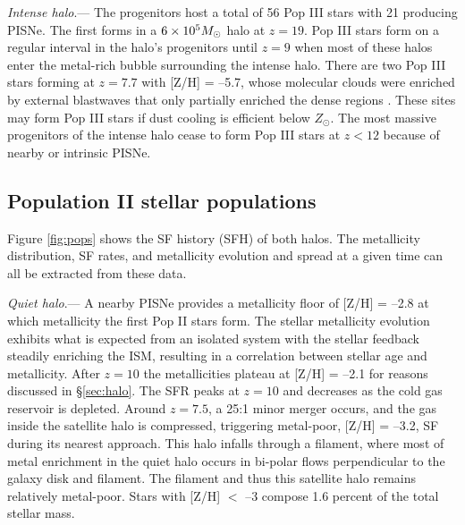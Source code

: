 \documentclass[apjl]{emulateapj}
\begin{document}
\textit{Intense halo}.--- The progenitors host a total of 56 Pop III
stars with 21 producing PISNe.  The first forms in a $6 \times 10^5
\Ms$ halo at $z=19$.  Pop III stars form on a regular interval in the
halo's progenitors until $z=9$ when most of these halos enter the
metal-rich bubble surrounding the intense halo.  There are two Pop III
stars forming at $z=7.7$ with [Z/H] = --5.7, whose molecular clouds
were enriched by external blastwaves that only partially enriched the
dense regions \citep{Cen08}.  These sites may form Pop III stars if
dust cooling is efficient below  $Z_\odot$.  The most
massive progenitors of the intense halo cease to form Pop III stars at
$z<12$ because of nearby or intrinsic PISNe.

\subsection{Population II stellar populations}
\label{sec:pop}

\begin{figure*}
  \caption{\label{fig:pops} The scatter plots show the SF history of
    the quiet (left) and intense (right) halos as a function of
    metallicity at $z=7$.  Each circle represents a star cluster,
    whose area is proportional to its mass.  The open circles in the
    upper right represent sizes of $10^3$, $10^4$, and $10^5$ \Ms~star
    clusters.  The dashed lines in the right panel guide the eye to
    two stellar populations that were formed in two satellite halos,
    merging at $z=7.5$.  The upper histogram collects the SF history
    into 25 equal temporal bins.  The right histogram depicts the
    stellar metallicity distribution.}
\end{figure*}


Figure \ref{fig:pops} shows the SF history (SFH) of both halos.  The
metallicity distribution, SF rates, and metallicity evolution and
spread at a given time can all be extracted from these data.

\textit{Quiet halo}.--- A nearby PISNe provides a metallicity floor of
[Z/H] = --2.8 at which metallicity the first Pop II stars form.  The
stellar metallicity evolution exhibits what is expected from an
isolated system with the stellar feedback steadily enriching the ISM,
resulting in a correlation between stellar age and metallicity.  After
$z=10$ the metallicities plateau at [Z/H] = --2.1 for reasons
discussed in \S\ref{sec:halo}.  The SFR peaks at $z=10$ and decreases
as the cold gas reservoir is depleted.  Around $z=7.5$, a 25:1 minor
merger occurs, and the gas inside the satellite halo is compressed,
triggering metal-poor, [Z/H] = --3.2, SF during its nearest approach.
This halo infalls through a filament, where most of metal enrichment
in the quiet halo occurs in bi-polar flows perpendicular to the galaxy
disk and filament.  The filament and thus this satellite halo remains
relatively metal-poor.  Stars with [Z/H] $<$ --3 compose 1.6 percent
of the total stellar mass.
       
\end{document}
